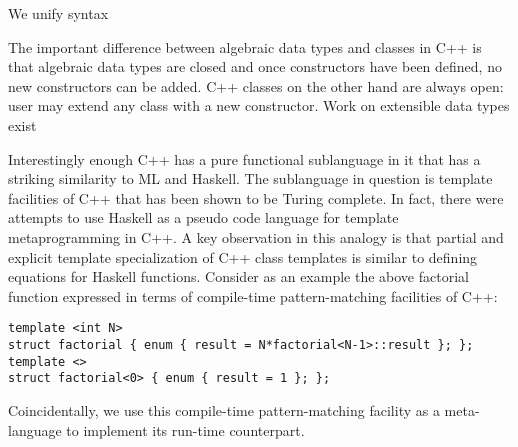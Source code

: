 \documentclass[preprint]{sigplanconf}
\begin{document}

We unify syntax 

The important difference between algebraic data types and classes in C++ is that
algebraic data types are closed and once constructors have been defined, no new
constructors can be added. C++ classes on the other hand are always open: user 
may extend any class with a new constructor. Work on extensible data types 
exist\cite{ExtensibleDatatypes,LohHinze2006}

%

Interestingly enough C++ has a pure functional sublanguage in it that has a 
striking similarity to ML and Haskell. The sublanguage in question is template 
facilities of C++ that has been shown to be Turing 
complete\cite{veldhuizen:templates_turing_complete}. In fact, there were 
attempts to use Haskell as a pseudo code language for template metaprogramming in 
C++\cite{Milewski11}. A key observation in this analogy is that partial and 
explicit template specialization of C++ class templates is similar to defining 
equations for Haskell functions. Consider as an example the above factorial 
function expressed in terms of compile-time pattern-matching facilities of C++:

\begin{lstlisting}
template <int N> 
struct factorial { enum { result = N*factorial<N-1>::result }; };
template <>
struct factorial<0> { enum { result = 1 }; };
\end{lstlisting}

Coincidentally, we use this compile-time pattern-matching facility as a 
meta-language to implement its run-time counterpart.
\end{document}
